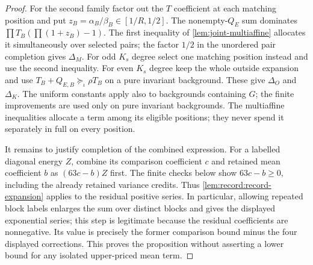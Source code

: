 \begin{proof}
For the second family factor out the $T$ coefficient at each matching
position and put $z_B=\alpha_B/\beta_B\in[1/R,1/2]$.
The nonempty-$Q_E$ sum dominates
$\prod T_B(\prod(1+z_B)-1)$.
The first inequality of \cref{lem:joint-multiaffine} allocates it
simultaneously over selected pairs; the factor $1/2$ in the unordered
pair completion gives $\Delta_M$.
For odd $K_s$ degree select one matching position instead and use the
second inequality. For even $K_s$ degree keep the whole outside
expansion and use $T_B+Q_{E,B}\succeq_\iota\rho T_B$ on a pure
invariant background. These give $\Delta_O$ and $\Delta_K$.
The uniform constants apply also to backgrounds containing $G$;
the finite improvements are used only on pure invariant backgrounds.
The multiaffine inequalities allocate a term among its eligible
positions; they never spend it separately in full on every position.

It remains to justify completion of the combined expression. For a
labelled diagonal energy $Z$, combine its comparison coefficient $c$
and retained mean coefficient $b$ as $(63c-b)Z$ first. The finite
checks below show $63c-b\ge0$, including the already retained variance
credits. Thus \cref{lem:record:record-expansion} applies to the residual
positive series. In particular, allowing repeated block labels enlarges
the sum over distinct blocks and gives the displayed exponential
series; this step is legitimate because the residual coefficients
are nonnegative. Its value is precisely
the former comparison bound minus the four displayed corrections.
This proves the proposition without asserting a lower bound for any
isolated upper-priced mean term.
\end{proof}

